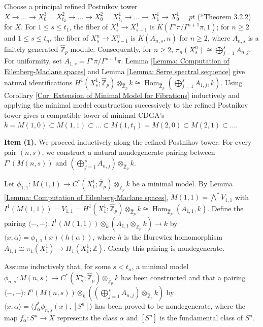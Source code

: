 \documentclass[11pt]{amsart}
\theoremstyle{definition}
\numberwithin{equation}{section}
\numberwithin{equation}{section}
\newcommand\ZZ{\mathbb{Z}}
\DeclareMathOperator{\homo}{Hom}
\begin{document}
Choose a principal refined Postnikov tower  $X\rightarrow ... \rightarrow X^3_{0}=X^2_{t_2} \rightarrow ... \rightarrow X^2_{0}=X^1_{t_1}\rightarrow ...\rightarrow X^1_{1}\rightarrow X^1_0=pt$ (\cite{more-concise}*{Theorem 3.2.2}) for $X$. For $1\leq s\leq t_1$, the fiber of $X^1_{s}\rightarrow X^1_{s-1}$ is $K(\Gamma^{s}\pi/\Gamma^{s+1}\pi,1)$; for $n\geq 2$ and $1\leq s\leq t_n$, the fiber of $X^n_s\rightarrow X^n_{s-1}$ is $K(A_{n,s},n)$ for $n\geq 2$, where $A_{n,s}$  is a finitely generated $\widehat{\ZZ}_p$-module. Consequently, for $n\geq 2$, $\pi_n(X^n_s)\cong \bigoplus_{j=1}^{s} A_{n,j}$. For uniformity, set $A_{1,s}=\Gamma^{s}\pi/\Gamma^{s+1}\pi$. Lemma \ref{Lemma: Computation of Eilenberg-Maclane spaces} and Lemma \ref{Lemma: Serre spectral sequence} give natural identifications $H^1(X^1_s;\widehat{\ZZ}_p)\otimes_{\widehat{\ZZ}_p}k \cong \homo_{\widehat{\ZZ}_p}(\bigoplus_{j=1}^sA_{1,j},k)$. Using Corollary \ref{Cor: Extension of Minimal Model for Fibrations} inductively and applying
the minimal model construction successively to the refined Postnikov tower gives a compatible tower of minimal CDGA's
$k=M(1,0)\subset M(1,1)\subset ...\subset M(1,t_1)=M(2,0)\subset M(2,1)\subset ...$.

\textbf{Item (1).} We proceed inductively along the refined Postnikov tower. For every pair $(n,s)$, we construct a natural nondegenerate pairing between $I^n(M(n,s))$ and $(\bigoplus_{j=1}^{s} A_{n,j})\otimes_{\widehat{\ZZ}_p} k$.

Let $\phi_{1,1}:M(1,1)\rightarrow C^*(X^1_1;\widehat{\ZZ}_p)\otimes_{\widehat{\ZZ}_p} k$ be a minimal model. By Lemma \ref{Lemma: Computation of Eilenberg-Maclane spaces}, $M(1,1)=\bigwedge^* V_{1,1}$ with $I^1(M(1,1))=V_{1,1}=H^1(X^1_1;\widehat{\ZZ}_p)\otimes_{\widehat{\ZZ}_p} k\cong \homo_{\widehat{\ZZ}_p}(A_{1,1},k)$. Define the pairing $
\langle -,- \rangle: I^1(M(1,1))\otimes_{k} (A_{1,1}\otimes_{\widehat{\ZZ}_p} k)\rightarrow k
$
by $\langle x,\alpha \rangle=\phi_{1,1}(x)(h(\alpha))$, where $h$ is the Hurewicz homomorphism $A_{1,1}\cong \pi_1(X^1_1)\rightarrow H_1(X^1_1;\ZZ)$. Clearly this pairing is nondegenerate.

Assume inductively that, for some $s<t_n$, a minimal model $\phi_{n,s}:M(n,s)\rightarrow C^*(X^n_s;\widehat{\ZZ}_p)\otimes_{\widehat{\ZZ}_p} k$  has been constructed and that
a pairing $
\langle -,- \rangle: I^n(M(n,s))\otimes_{k} ((\bigoplus_{j=1}^{s} A_{n,j})\otimes_{\widehat{\ZZ}_p} k)
$
by $\langle x,\alpha \rangle=\langle f_{\alpha}^*\phi_{n,s}(x),[S^{n}]\rangle$ has been proved to be nondegenerate, where the map $f_{\alpha}:S^n\rightarrow X$ represents the class $\alpha$ and $[S^n]$ is the fundamental class of $S^n$. 
\end{document}

